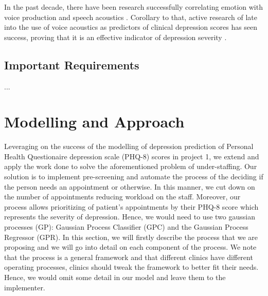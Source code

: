 \documentclass{article}
\begin{document}
	In the past decade, there have been research successfully correlating emotion with voice production and speech acoustics \cite{uwa2001}. 
	Corollary to that, active research of late into the use of voice acoustics as predictors of clinical depression scores has seen success, proving that it is an effective indicator of depression severity \cite{jov2016}.\\
	
	\subsection{Important Requirements}
	...
	
	\section{Modelling and Approach}
	Leveraging on the success of the modelling of depression prediction of Personal Health Questionaire depression scale (PHQ-8) scores in project 1, we extend and apply the work done to solve the aforementioned problem of under-staffing.
	Our solution is to implement pre-screening and automate the process of the deciding if the person needs an appointment or otherwise.
	In this manner, we cut down on the number of appointments reducing workload on the staff. 
	Moreover, our process allows prioritizing of patient's appointments by their PHQ-8 score which represents the severity of depression.
	Hence, we would need to use two gaussian processes (GP): Gaussian Process Classifier (GPC) and the Gaussian Process Regressor (GPR). 
	In this section, we will firstly describe the process that we are proposing and we will go into detail on each component of the process. 
	We note that the process is a general framework and that different clinics have different operating processes, clinics should tweak the framework to better fit their needs. 
	Hence, we would omit some detail in our model and leave them to the implementer.
\end{document}
